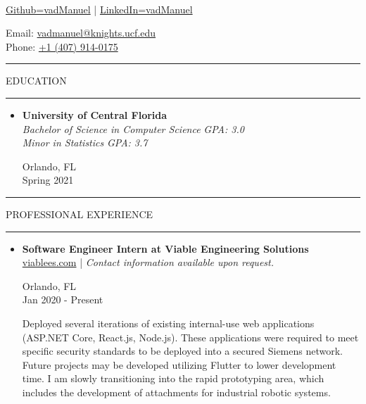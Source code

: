 \documentclass{article}
\makeatletter
\newcommand{\name}{Manuel Vasquez}
\newcommand{\website}{\href{https://www.github.com/vadmanuel}{Github=vadManuel} | \href{https://www.linkedin.com/in/vadmanuel}{LinkedIn=vadManuel}}
\newcommand{\email}{\href{mailto:vadmanuel@knights.ucf.edu}{vadmanuel@knights.ucf.edu}}
\newcommand{\phone}{\href{tel:+14079140175}{+1 (407) 914-0175}}
\newcommand{\makeminipage}[4]{
    \begin{minipage}[c]{.7\linewidth}
        \flushleft #1 \\ #2
    \end{minipage} \hfill
    \begin{minipage}[c]{.29\linewidth}
        \flushright #3 \\ #4
    \end{minipage}
}
\newcommand{\makesection}[1]{\hrule\vskip1mm\uppercase{#1}\vskip1mm\hrule}
\makeatother
\begin{document}
\setlength{\parindent}{0cm}

\makeminipage
    {{\large\textbf{\name}}}
    {\website}
    {Email: \email}
    {Phone: \phone}
\bigbreak

\makesection{Education}
\begin{itemize}[leftmargin=.35cm]
    \item {
    \makeminipage
        {\textbf{University of Central Florida}}
        {\textit{Bachelor of Science in Computer Science}\hspace*{2mm} \textit{GPA: 3.0} \\
        \textit{Minor in Statistics}\hspace*{36.4mm} \textit{GPA: 3.7}}
        {Orlando, FL}
        {Spring 2021}
    }
\end{itemize}

\makesection{Professional Experience}
\begin{itemize}[leftmargin=.35cm]
    \item {
        \makeminipage
            {\textbf{Software Engineer Intern at Viable Engineering Solutions}}
            {\href{https://wwww.viablees.com}{viablees.com} | \textit{Contact information available upon request.}}
            {Orlando, FL}
            {Jan 2020 - Present}

        Deployed several iterations of existing internal-use web applications (ASP.NET Core, React.js, Node.js). These applications were required to meet specific security standards to be deployed into a secured Siemens network. Future projects may be developed utilizing Flutter to lower development time. I am slowly transitioning into the rapid prototyping area, which includes the development of attachments for industrial robotic systems.
    }
\end{itemize}
\end{document}
